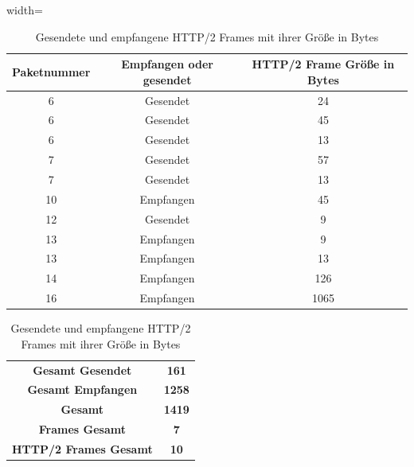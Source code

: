 \begin{table}
    \centering
    \begin{adjustbox}{width=\textwidth}
        \begin{minipage}{\textwidth}
            \centering
            \begin{tabular}{|c|c|c|}
                \hline
                \textbf{Paketnummer} & \textbf{Empfangen oder gesendet} & \textbf{HTTP/2 Frame Größe in Bytes} \\
                \hline
                6 & Gesendet & 24 \\
                6 & Gesendet & 45 \\
                6 & Gesendet & 13 \\
                7 & Gesendet & 57 \\
                7 & Gesendet & 13 \\
                10 & Empfangen & 45 \\
                12 & Gesendet & 9 \\
                13 & Empfangen & 9 \\
                13 & Empfangen & 13 \\
                14 & Empfangen & 126 \\
                16 & Empfangen & 1065 \\
                \hline
            \end{tabular}

            \vspace{0.2cm}

            \begin{tabular}{|c|c|}
                \hline
                \textbf{Gesamt Gesendet} & \textbf{161} \\
                \textbf{Gesamt Empfangen} & \textbf{1258} \\
                \textbf{Gesamt} & \textbf{1419} \\
                \textbf{Frames Gesamt} & \textbf{7} \\
                \textbf{HTTP/2 Frames Gesamt} & \textbf{10} \\
                \hline
            \end{tabular}
        \end{minipage}
    \end{adjustbox}
    \caption{Gesendete und empfangene HTTP/2 Frames mit ihrer Größe in Bytes}\label{tab:packet_size}
\end{table}

